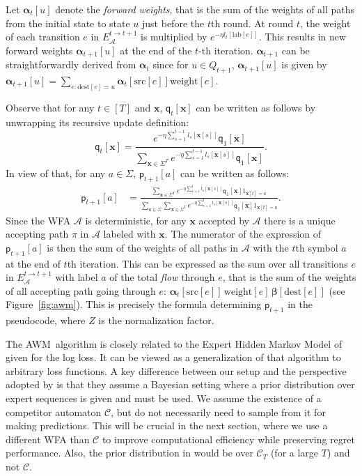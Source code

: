 \documentclass{article}
\newcommand{\sA}{\mathscr A}
\newcommand{\sC}{\mathscr C}
\newcommand{\bx}{{\mathbf x}}
\newcommand{\balpha}{{\boldsymbol \alpha}}
\newcommand{\bbeta}{{\boldsymbol \beta}}
\newcommand{\sfp}{{\mathsf p}}
\newcommand{\sfq}{{\mathsf q}}
\newcommand{\dest}{\mathrm{dest}}
\newcommand{\src}{\mathrm{src}}
\newcommand{\lab}{\mathrm{lab}}
\newcommand{\weight}{\mathrm{weight}}
\newcommand{\AWM}{\textsc{AWM}}
\begin{document}
Let $\balpha_t[u]$ denote the \emph{forward weights}, that is the sum
of the weights of all paths from the initial state to state $u$ just
before the $t$th round.  At round $t$, the weight of each transition
$e$ in $E_{\sA}^{t \to t + 1}$ is multiplied by
$e^{-\eta l_t[\lab[e]]}$.  This results in new forward weights
$\balpha_{t + 1}[u]$ at the end of the $t$-th iteration.  $\balpha_{t + 1}$
can be straightforwardly derived from $\balpha_t$ since for
$u \in Q_{t + 1}$, $\balpha_{t + 1}[u]$ is given by
$\balpha_{t + 1}[u] = \sum_{e\colon \dest[e] = u} \balpha_t[\src[e]]
\weight[e]$. 

Observe that for any $t \in [T]$ and $\bx$, $\sfq_t[\bx]$ can be
written as follows by unwrapping its recursive update definition:
$$\sfq_t[\bx] = \frac{e^{-\eta \sum_{s = 1}^{t - 1} l_s[\bx[s]]}
  \sfq_1[\bx]}{\sum_{\bx \in \Sigma^T} e^{-\eta \sum_{s = 1}^{t - 1}
    l_s[\bx[s]]} \sfq_1[\bx]}.$$
    In view of that, for any
$a \in \Sigma$, $\sfp_{t + 1}[a]$ can be written as follows:
\begin{align*}
\sfp_{t + 1}[a] 
& = \frac{\sum_{\bx \in \Sigma^T} e^{-\eta \sum_{s = 1}^t
    l_s[\bx[s]]} \sfq_1[\bx] 1_{\bx[t] =
    a}}{\sum_{a \in \Sigma} \sum_{\bx \in \Sigma^T} e^{-\eta \sum_{s = 1}^t
    l_s[\bx[s]]} \sfq_1[\bx] 1_{\bx[t] =
    a}}.
\end{align*}
Since the WFA $\sA$ is deterministic, for any $\bx$ accepted by $\sA$
there is a unique accepting path $\pi$ in $\sA$ labeled with
$\bx$. The numerator of the expression of $\sfp_{t + 1}[a]$ is then
the sum of the weights of all paths in $\sA$ with the $t$th symbol $a$
at the end of $t$th iteration. This can be expressed as the sum over
all transitions $e$ in $E_{\sA}^{t \to t + 1}$ with label $a$ of the
total \emph{flow} through $e$, that is the sum of the weights of all
accepting path going through $e$:
$\balpha_t[\src[e]] \, \weight[e] \, \bbeta[\dest[e]]$ (see
Figure~\ref{fig:awm}).  This is precisely the formula 
determining $\sfp_{t + 1}$ in the pseudocode, where $Z$ is the
normalization factor.

The \AWM\ algorithm is closely related to the Expert Hidden Markov
Model of \cite{KoolenDeRooij2013} given for the log loss. It can be
viewed as a generalization of that algorithm to arbitrary loss
functions. A key difference between our setup and the perspective
adopted by \cite{KoolenDeRooij2013} is that they assume a Bayesian
setting where a prior distribution over expert sequences is given and
must be used. We assume the existence of a competitor automaton
$\sC$, but do not necessarily need to sample from it for making
predictions. This will be crucial in the next section, where we use a
different WFA than $\sC$ to improve computational efficiency while
preserving regret performance. Also,  
the prior distribution in \citep{KoolenDeRooij2013} would be over
$\sC_T$ (for a large $T$) and not $\sC$.
\end{document}
